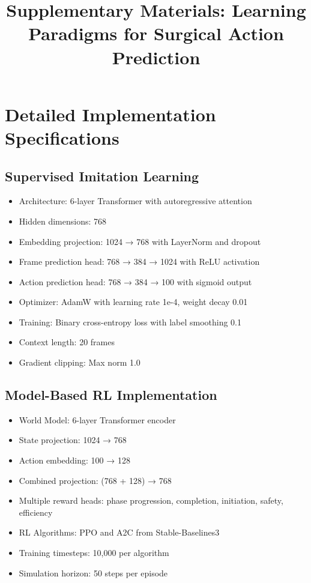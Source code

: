 \documentclass{article}
\title{Supplementary Materials: Learning Paradigms for Surgical Action Prediction}
\begin{document}
\maketitle

\section{Detailed Implementation Specifications}

\subsection{Supervised Imitation Learning}
\begin{itemize}
\item Architecture: 6-layer Transformer with autoregressive attention
\item Hidden dimensions: 768
\item Embedding projection: 1024 → 768 with LayerNorm and dropout
\item Frame prediction head: 768 → 384 → 1024 with ReLU activation
\item Action prediction head: 768 → 384 → 100 with sigmoid output
\item Optimizer: AdamW with learning rate 1e-4, weight decay 0.01
\item Training: Binary cross-entropy loss with label smoothing 0.1
\item Context length: 20 frames
\item Gradient clipping: Max norm 1.0
\end{itemize}

\subsection{Model-Based RL Implementation}
\begin{itemize}
\item World Model: 6-layer Transformer encoder
\item State projection: 1024 → 768
\item Action embedding: 100 → 128
\item Combined projection: (768 + 128) → 768
\item Multiple reward heads: phase progression, completion, initiation, safety, efficiency
\item RL Algorithms: PPO and A2C from Stable-Baselines3
\item Training timesteps: 10,000 per algorithm
\item Simulation horizon: 50 steps per episode
\end{itemize}
\end{document}
